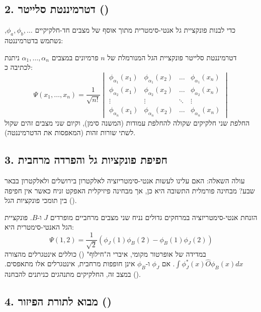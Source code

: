 \subsection*{2. דטרמיננטת סלייטר ()}

כדי לבנות פונקציית גל אנטי-סימטרית מתוך אוסף של מצבים חד-חלקיקיים $\phi_a, \phi_b, \dots$, נשתמש בדטרמיננטה:

\begin{resultbox}{דטרמיננטת סלייטר}
פונקציית הגל המנורמלת של $n$ פרמיונים במצבים $\alpha_1, \dots, \alpha_n$ ניתנת לכתיבה כ:
$$\Psi(x_1, \dots, x_n) = \frac{1}{\sqrt{n!}} \begin{vmatrix} 
\phi_{\alpha_1}(x_1) & \phi_{\alpha_1}(x_2) & \dots & \phi_{\alpha_1}(x_n) \\
\phi_{\alpha_2}(x_1) & \phi_{\alpha_2}(x_2) & \dots & \phi_{\alpha_2}(x_n) \\
\vdots & \vdots & \ddots & \vdots \\
\phi_{\alpha_n}(x_1) & \phi_{\alpha_n}(x_2) & \dots & \phi_{\alpha_n}(x_n)
\end{vmatrix}$$
החלפת שני חלקיקים שקולה להחלפת עמודות (המשנה סימן), וקיום שני מצבים זהים שקול לשתי שורות זהות (המאפסות את הדטרמיננטה).
\end{resultbox}

\subsection*{3. חפיפת פונקציות גל והפרדה מרחבית}

עולה השאלה: האם עלינו לעשות אנטי-סימטריזציה לאלקטרון בירושלים ולאלקטרון בבאר שבע?
מבחינה פורמלית התשובה היא כן, אך מבחינה פיזיקלית האפקט זניח כאשר אין חפיפה () בין תומכי פונקציות הגל.

\begin{theorembox}{הזנחת אנטי-סימטריזציה במרחקים גדולים}
נניח שני מצבים מרחביים מופרדים $J$ ו-$B$. פונקציית הגל האנטי-סימטרית היא:
$$\Psi(1,2) = \frac{1}{\sqrt{2}} \left( \phi_J(1)\phi_B(2) - \phi_B(1)\phi_J(2) \right)$$
במדידה של אופרטור מקומי, איברי ה"חילוף" () כוללים אינטגרלים מהצורה $\int \phi_J^*(x) \hat{O} \phi_B(x) dx$. אם $\phi_J$ ו-$\phi_B$ אינן חופפות מרחבית, אינטגרלים אלו מתאפסים. במצב זה, החלקיקים מתנהגים כניתנים להבחנה ().
\end{theorembox}

\subsection*{4. מבוא לתורת הפיזור ()}

